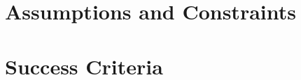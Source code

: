 \documentclass[12pt]{article} %
\begin{document}
		
	
	
	
	
	
	
	
	

	

	
	
	
	
	\section{Assumptions and Constraints}
	
	
	
	
	

	
	
	
	\section{Success Criteria} %
	
\end{document}
